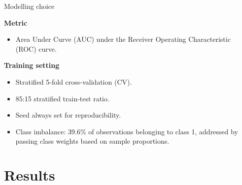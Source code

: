 \documentclass[aspectratio=169,xcolor=dvipsnames]{beamer}
\begin{document}
\begin{frame}{Modelling choice}

\textbf{Metric}
\begin{itemize}
    \item Area Under Curve (AUC) under the Receiver Operating Characteristic (ROC) curve.
\end{itemize}
\textbf{Training setting} 
\begin{itemize}
    \item Stratified 5-fold cross-validation (CV).
    \item 85:15 stratified train-test ratio.
    \item Seed always set for reproducibility.
    \item Class imbalance: \alert{39.6\%} of observations belonging to class 1, addressed by passing class weights based on sample proportions.
\end{itemize}
    
\end{frame}


\section{Results}



\end{document}
